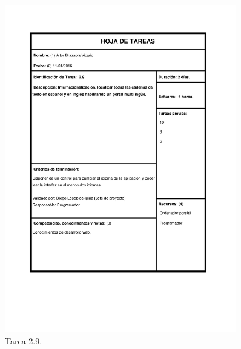 \documentclass{DeustoFDP}
\begin{document}
\begin{figure}[H]
    \centering
    \includegraphics[width=0.9\textwidth]{fig/Tareas/29}
    \caption{Tarea 2.9.}
    \label{fig:t29}
\end{figure}
\end{document}
